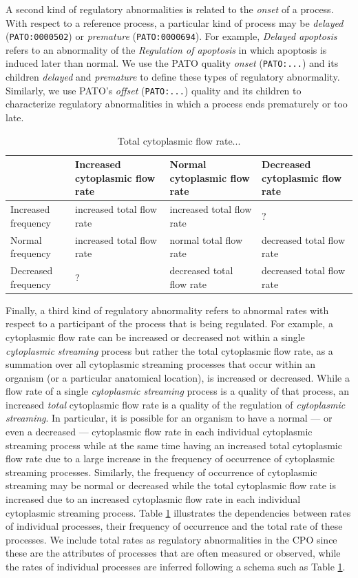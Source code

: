 \documentclass{bioinfo}
\begin{document}
A second kind of regulatory abnormalities is related to the {\em
  onset} of a process. With respect to a reference process, a
particular kind of process may be {\em delayed} ({\tt PATO:0000502})
or {\em premature} ({\tt PATO:0000694}). For example, {\em Delayed
  apoptosis} refers to an abnormality of the {\em Regulation of
  apoptosis} in which apoptosis is induced later than normal.  We use
the PATO quality {\em onset} ({\tt PATO:...}) and its children {\em
  delayed} and {\em premature} to define these types of regulatory
abnormality. Similarly, we use PATO's {\em offset} ({\tt PATO:...})
  quality and its children to characterize regulatory abnormalities in
  which a process ends prematurely or too late.

\begin{table}
  \centering
  \begin{tabular}{l|l|l|l}
    & Increased cytoplasmic flow rate & Normal cytoplasmic flow rate & Decreased
    cytoplasmic flow rate \\
    \hline
    Increased frequency &increased total flow rate &increased total
    flow rate &?\\
    Normal frequency &increased total flow rate &normal total flow
    rate &decreased total flow rate\\
    Decreased frequency &?&decreased total flow rate &decreased total
    flow rate\\
    \hline
  \end{tabular}
  \caption{\label{tbl:flow}Total cytoplasmic flow rate...}
\end{table}

Finally, a third kind of regulatory abnormality refers to abnormal
rates with respect to a participant of the process that is being
regulated. For example, a cytoplasmic flow rate can be increased or
decreased not within a single {\em cytoplasmic streaming} process but
rather the total cytoplasmic flow rate, as a summation over all
cytoplasmic streaming processes that occur within an organism (or a
particular anatomical location), is increased or decreased. While a
flow rate of a single {\em cytoplasmic streaming} process is a quality
of that process, an increased {\em total} cytoplasmic flow rate is a
quality of the regulation of {\em cytoplasmic streaming}. In
particular, it is possible for an organism to have a normal --- or
even a decreased --- cytoplasmic flow rate in each individual
cytoplasmic streaming process while at the same time having an
increased total cytoplasmic flow rate due to a large increase in the
frequency of occurrence of cytoplasmic streaming processes. Similarly,
the frequency of occurrence of cytoplasmic streaming may be normal or
decreased while the total cytoplasmic flow rate is increased due to an
increased cytoplasmic flow rate in each individual cytoplasmic
streaming process. Table \ref{tbl:flow} illustrates the dependencies
between rates of individual processes, their frequency of occurrence
and the total rate of these processes. We include total rates as
regulatory abnormalities in the CPO since these are the attributes of
processes that are often measured or observed, while the rates of
individual processes are inferred following a schema such as Table
\ref{tbl:flow}.
\end{document}
